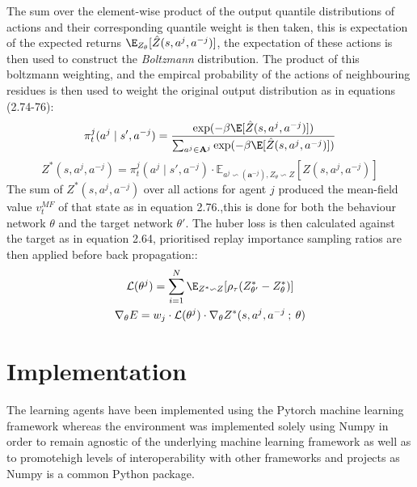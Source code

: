 The sum over the element-wise product of the output quantile distributions of actions and their
corresponding quantile weight is then taken, this is expectation of the expected returns
$\E_{Z_{\theta}}[\hat{Z}(s,a^j, a^{-j})]$, the expectation of these actions is then used to construct the 
\emph{Boltzmann} distribution.
The product of this boltzmann weighting, and the empircal probability of the actions
of neighbouring residues is then used to weight the original output distribution as in 
equations (2.74-76):
\begin{equation}
    \pi^j_t(a^j \mid s',a^{-j}) = \frac{\exp(- \beta \E[\hat{Z}(s,a^j, a^{-j})])}{\sum_{a^j \in \mathbf{A}^j} \exp(- \beta \E[\hat{Z}(s,a^j, a^{-j})])}
\end{equation}
\begin{equation}
    Z^*(s,a^j, a^{-j}) = \pi^j_t(a^j \mid s',a^{-j}) \cdot \mathbb{E}_{a^j \backsim(\mathbf{a}^{-j}), Z_\theta \backsim Z}[\hat{Z}(s,a^j, a^{-j})]
\end{equation}
The sum of $Z^*(s,a^j, a^{-j})$ over all actions for agent $j$ produced the mean-field value $v^{MF}_t$ of that state as 
in equation 2.76.,this is done for both the behaviour network $\theta$ and the target network $\theta'$.
The huber loss is then calculated against the target as in equation 2.64,
prioritised replay importance sampling ratios are then applied before back propagation::
\begin{equation}
    \begin{gathered}
        \mathcal{L}(\theta^j) = \sum^N_{i=1} \E_{Z^* \backsim Z}[\rho_{\tau}(Z^*_{\theta'} - Z^*_{\theta})] \\
    \nabla_\theta E = w_j \cdot \mathcal{L}(\theta^j) \cdot \nabla_\theta Z^*(s,a^j, a^{-j}\: ; \: \theta)
    \end{gathered}
\end{equation}

\section{Implementation}
The learning agents have been implemented using the Pytorch
machine learning framework whereas the environment was implemented
solely using Numpy in order to remain agnostic of the underlying machine
learning framework as well as to promotehigh levels of interoperability
with other frameworks and projects as Numpy is a common Python package.

